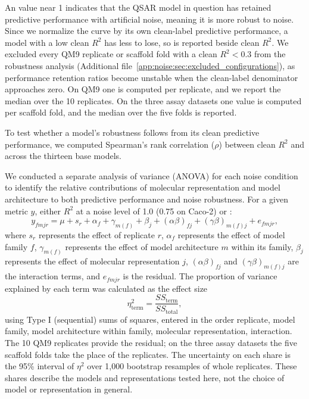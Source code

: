 An \aucnorm{} value near 1 indicates that the QSAR model in question has retained predictive performance with artificial noise, meaning it is more robust to noise. Since we normalize the curve by its own clean-label predictive performance, a model with a low clean $R^2$ has less to lose, so \aucnorm{} is reported beside clean $R^2$. We excluded every QM9 replicate or scaffold fold with a clean $R^2 < 0.3$ from the robustness analysis (Additional file~\ref{app:noise:sec:excluded_configurations}), as performance retention ratios become unstable when the clean-label denominator approaches zero. On QM9 one \aucnorm{} is computed per replicate, and we report the median over the 10 replicates. On the three assay datasets one value is computed per scaffold fold, and the median over the five folds is reported. 

To test whether a model's robustness follows from its clean predictive performance, we computed Spearman's rank correlation ($\rho$) between clean $R^2$ and \aucnorm{} across the thirteen base models.

We conducted a separate analysis of variance (ANOVA) for each noise condition to identify the
relative contributions of molecular representation and model architecture to both predictive
performance and noise robustness. For a given metric $y$, either $R^2$ at a noise level of 1.0 (0.75 on Caco-2) or
\aucnorm:
\begin{equation}
y_{fmjr} = \mu + s_r + \alpha_f + \gamma_{m(f)} + \beta_j + (\alpha\beta)_{fj} + (\gamma\beta)_{m(f)j} + e_{fmjr},
\end{equation}
where $s_r$ represents the effect of replicate $r$, $\alpha_f$ represents the effect of model family $f$, $\gamma_{m(f)}$ represents the effect of model architecture $m$ within its family, $\beta_j$ represents the effect of
molecular representation $j$, $(\alpha\beta)_{fj}$ and $(\gamma\beta)_{m(f)j}$ are the interaction terms, and $e_{fmjr}$ is the
residual. The proportion of variance explained by each term was calculated as the
effect size
\begin{equation}
\eta^2_{\text{term}} = \frac{SS_{\text{term}}}{SS_{\text{total}}},
\end{equation}
using Type I (sequential) sums of squares, entered in the order replicate, model family, model architecture within family, molecular
representation, interaction. The 10 QM9 replicates provide the residual; on the three assay datasets the five scaffold folds take the place of the replicates. The uncertainty on each share is the 95\% interval of $\eta^2$ over 1,000 bootstrap resamples of whole replicates. These shares describe the models and representations tested here, not the choice of model or representation in general. 


